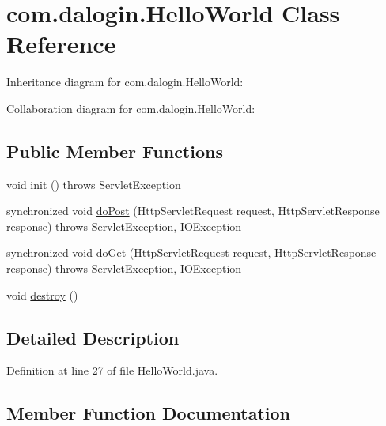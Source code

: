 \hypertarget{classcom_1_1dalogin_1_1_hello_world}{}\section{com.\+dalogin.\+Hello\+World Class Reference}
\label{classcom_1_1dalogin_1_1_hello_world}


Inheritance diagram for com.\+dalogin.\+Hello\+World\+:


Collaboration diagram for com.\+dalogin.\+Hello\+World\+:
\subsection*{Public Member Functions}
\begin{DoxyCompactItemize}
\item 
void \hyperlink{classcom_1_1dalogin_1_1_hello_world_a77eee8b13b0518d10d453163b759118e}{init} ()  throws Servlet\+Exception 
\item 
synchronized void \hyperlink{classcom_1_1dalogin_1_1_hello_world_a5743fb630d7e93946a8d0fd1e8ff6fa1}{do\+Post} (Http\+Servlet\+Request request, Http\+Servlet\+Response response)  throws Servlet\+Exception, I\+O\+Exception     
\item 
synchronized void \hyperlink{classcom_1_1dalogin_1_1_hello_world_ac32fae0ca47965646d7f65001995f9a4}{do\+Get} (Http\+Servlet\+Request request, Http\+Servlet\+Response response)  throws Servlet\+Exception, I\+O\+Exception     
\item 
void \hyperlink{classcom_1_1dalogin_1_1_hello_world_a5ae784d0e79053b1393c619864623c9f}{destroy} ()
\end{DoxyCompactItemize}


\subsection{Detailed Description}


Definition at line 27 of file Hello\+World.\+java.



\subsection{Member Function Documentation}
\mbox{\label{classcom_1_1dalogin_1_1_hello_world_a5ae784d0e79053b1393c619864623c9f}} 
